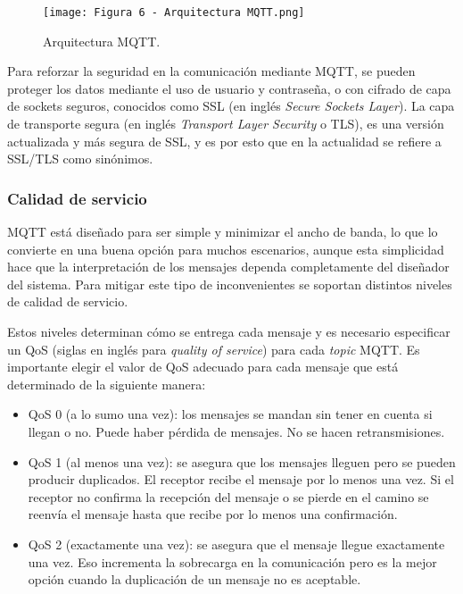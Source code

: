 \begin{figure}[h]
\centering
\texttt{[image: Figura 6 - Arquitectura MQTT.png]}
\caption[Arquitectura MQTT]{Arquitectura MQTT. \footnotemark}
\label{fig:6}
\end{figure}

Para reforzar la seguridad en la comunicación mediante MQTT, se pueden proteger los datos mediante el uso de usuario y contraseña, o con cifrado de capa de sockets seguros, conocidos como SSL (en inglés \textit{Secure Sockets Layer}). La capa de transporte segura (en inglés \textit{Transport Layer Security} o TLS), es una versión actualizada y más segura de SSL, y es por esto que en la actualidad se refiere a SSL/TLS como sinónimos.

\subsubsection{Calidad de servicio}

MQTT está diseñado para ser simple y minimizar el ancho de banda, lo que lo convierte en una buena opción para muchos escenarios, aunque esta simplicidad hace que la interpretación de los mensajes dependa completamente del diseñador del sistema. Para mitigar este tipo de inconvenientes se soportan distintos niveles de calidad de servicio.

Estos niveles determinan cómo se entrega cada mensaje y es necesario especificar un QoS (siglas en inglés para \textit{quality of service}) para cada \textit{topic} MQTT. Es importante elegir el valor de QoS adecuado para cada mensaje que está determinado de la siguiente manera:

\begin{itemize}
	\item QoS 0 (a lo sumo una vez): los mensajes se mandan sin tener en cuenta si llegan o no. Puede haber pérdida de mensajes. No se hacen retransmisiones.
	\item QoS 1 (al menos una vez): se asegura que los mensajes lleguen pero se pueden producir duplicados. El receptor recibe el mensaje por lo menos una vez. Si el receptor no confirma la recepción del mensaje o se pierde en el camino se reenvía el mensaje hasta que recibe por lo menos una confirmación.
	\item QoS 2 (exactamente una vez): se asegura que el mensaje llegue exactamente una vez. Eso incrementa la sobrecarga en la comunicación pero es la mejor opción cuando la duplicación de un mensaje no es aceptable.
\end{itemize}

